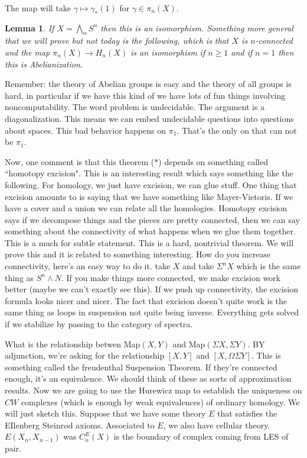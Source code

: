 \documentclass[12pt]{article}
\newtheorem{lemma}[theorem]{Lemma}
\theoremstyle{definition}
\begin{document}
The map will take $\gamma\mapsto \gamma_\ast(1)$ for $\gamma\in \pi_n(X)$. 

\begin{lemma}{1}
	If $X=\bigwedge_\alpha S^n$ then this is an isomorphism. Something more general that we will prove but not today is the following, which is that $X$ is $n$-connected and the map $\pi_n(X)\to H_n(X)$ is an isomorphism if $n\geq 1$ and if $n=1$ then this is Abelianization. 	
\end{lemma} 

Remember: the theory of Abelian groups is easy and the theory of all groups is hard, in particular if we have this kind of we have lots of fun things involving noncomputability. The word problem is undecidable. The argument is a diagonalization. This means we can embed undecidable questions into questions about spaces. This bad behavior happens on $\pi_1$. That's the only on that can not be $\pi_1$. 

Now, one comment is that this theorem ($\ast$) depends on something called ``homotopy excision". This is an interesting result which says something like the following. For homology, we just have excision, we can glue stuff. One thing that excision amounts to is saying that we have something like Mayer-Vietoris. If we have a cover and a union we can relate all the homologies. Homotopy excision says if we decompose things and the pieces are pretty connected, then we can say something about the connectivity of what happens when we glue them together. This is a much for subtle statement. This is a hard, nontrivial theorem. We will prove this and it is related to something interesting. How do you increase connectivity, here's an easy way to do it. take $X$ and take $\Sigma^n X$ which is the same thing as $S^n\wedge N$. If you make things more connected, we make excision work better (maybe we can't exactly see this). If we push up connectivity, the excision formula looks nicer and nicer. The fact that excision doesn't quite work is the same thing as loops in suspension not quite being inverse. Everything gets solved if we stabilize by passing to the category of spectra. 

What is the relationship betwen \textsf{Map}$(X,Y)$ and \textsf{Map}$(\Sigma X,\Sigma Y)$. BY adjunction, we're asking for the relationship $[X,Y]$ and $[X,\Omega\Sigma Y]$. This is something called the 
freudenthal Suspension Theorem. If they're connected enough, it's an equivalence. We should think of these as sorts of approximation results. Now we are going to use the Hurewicz map to establish the uniqueness on $CW$ complexes (which is enough by weak equivalences) of ordinary homology. We will just sketch this. Suppose that we have some theory $E$ that satisfies the EIlenberg Steinrod axioms. Associated to $E$, we also have cellular theory.  $E(X_n, X_{n-1})$ was $C_n^E(X)$ is the boundary of complex coming from LES of pair. 
\end{document}
